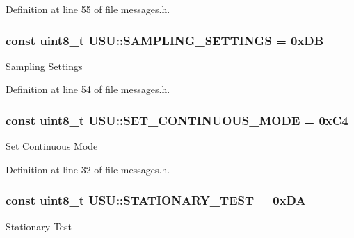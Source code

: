 \-Definition at line 55 of file messages.\-h.

\hypertarget{namespace_u_s_u_aeb8ec20b4bb74ff2895ab487c29810e0}{
\subsubsection[{\-S\-A\-M\-P\-L\-I\-N\-G\-\_\-\-S\-E\-T\-T\-I\-N\-G\-S}]{\setlength{\rightskip}{0pt plus 5cm}const uint8\-\_\-t {\bf \-U\-S\-U\-::\-S\-A\-M\-P\-L\-I\-N\-G\-\_\-\-S\-E\-T\-T\-I\-N\-G\-S} = 0x\-D\-B}}\label{namespace_u_s_u_aeb8ec20b4bb74ff2895ab487c29810e0}
\-Sampling \-Settings 

\-Definition at line 54 of file messages.\-h.

\hypertarget{namespace_u_s_u_a1f3d4b142078bc61d7dea5676b399d29}{
\subsubsection[{\-S\-E\-T\-\_\-\-C\-O\-N\-T\-I\-N\-U\-O\-U\-S\-\_\-\-M\-O\-D\-E}]{\setlength{\rightskip}{0pt plus 5cm}const uint8\-\_\-t {\bf \-U\-S\-U\-::\-S\-E\-T\-\_\-\-C\-O\-N\-T\-I\-N\-U\-O\-U\-S\-\_\-\-M\-O\-D\-E} = 0x\-C4}}\label{namespace_u_s_u_a1f3d4b142078bc61d7dea5676b399d29}
\-Set \-Continuous \-Mode 

\-Definition at line 32 of file messages.\-h.

\hypertarget{namespace_u_s_u_aa13337d52a46707f63911e7c2972971b}{
\subsubsection[{\-S\-T\-A\-T\-I\-O\-N\-A\-R\-Y\-\_\-\-T\-E\-S\-T}]{\setlength{\rightskip}{0pt plus 5cm}const uint8\-\_\-t {\bf \-U\-S\-U\-::\-S\-T\-A\-T\-I\-O\-N\-A\-R\-Y\-\_\-\-T\-E\-S\-T} = 0x\-D\-A}}\label{namespace_u_s_u_aa13337d52a46707f63911e7c2972971b}
\-Stationary \-Test 

